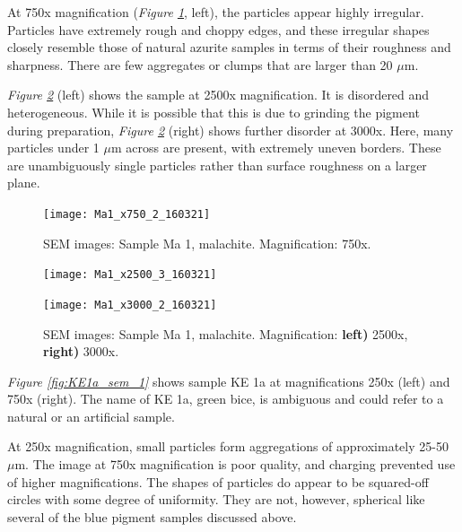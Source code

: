 At 750x magnification (\textit{Figure \ref{fig:Ma1_sem_1}}, left), the particles appear highly irregular. Particles have extremely rough and choppy edges, and these irregular shapes closely resemble those of natural azurite samples in terms of their roughness and sharpness. There are few aggregates or clumps that are larger than 20 $\mu$m.  

\textit{Figure \ref{fig:Ma1_sem_2}} (left) shows the sample at 2500x magnification. It is disordered and heterogeneous. While it is possible that this is due to grinding the pigment during preparation, \textit{Figure \ref{fig:Ma1_sem_2}} (right) shows further disorder at 3000x. Here, many particles under 1 $\mu$m across are present, with extremely uneven borders. These are unambiguously single particles rather than surface roughness on a larger plane.

\begin{figure}[H]
\centering
\texttt{[image: Ma1\_x750\_2\_160321]}
\caption[SEM images: Sample Ma 1, malachite]{SEM images: Sample Ma 1, malachite. Magnification: 750x.}
\label{fig:Ma1_sem_1}
\end{figure}

\begin{figure}[H]
\centering
\begin{minipage}{.45\textwidth}
  \centering
  \texttt{[image: Ma1\_x2500\_3\_160321]}
\end{minipage}
\begin{minipage}{.45\textwidth}
  \centering
  \texttt{[image: Ma1\_x3000\_2\_160321]}
\end{minipage}
\caption[SEM images: Sample Ma 1, malachite]{SEM images: Sample Ma 1, malachite. Magnification: \textbf{left)} 2500x, \textbf{right)} 3000x.}
\label{fig:Ma1_sem_2}
\end{figure}


\textit{Figure \ref{fig:KE1a_sem_1}} shows sample KE 1a at magnifications 250x (left) and 750x (right). The name of KE 1a, green bice, is ambiguous and could refer to a natural or an artificial sample.

At 250x magnification, small particles form aggregations of approximately 25-50 $\mu$m. The image at 750x magnification is poor quality, and charging prevented use of higher magnifications. The shapes of particles do appear to be squared-off circles with some degree of uniformity. They are not, however, spherical like several of the blue pigment samples discussed above. 

